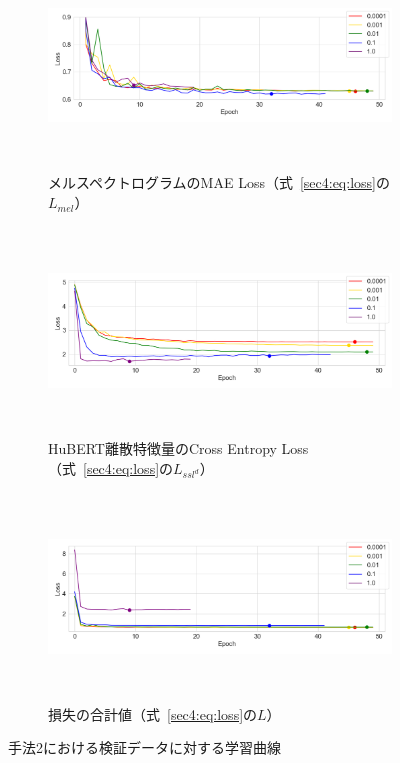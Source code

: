 \documentclass[12pt]{jarticle}
\numberwithin{equation}{section}    %
\numberwithin{figure}{section}      %
\numberwithin{table}{section}      %
\begin{document}
\begin{figure}[bt]
    \centering
    \begin{subfigure}{\linewidth}
        \centering
        \includegraphics[height=55mm]{./figure/sec4/learning_curve/impact_of_loss_weights_across_methods/2/mel_loss.png}
        \caption{メルスペクトログラムのMAE Loss（式~\eqref{sec4:eq:loss}の$L_{mel}$）}
        \label{sec4:fig:learning_curve_method_2_val_mel_loss}
    \end{subfigure}
    \begin{subfigure}{\linewidth}
        \centering
        \includegraphics[height=55mm]{./figure/sec4/learning_curve/impact_of_loss_weights_across_methods/2/ssl_feature_cluster_loss.png}
        \caption{HuBERT離散特徴量のCross Entropy Loss（式~\eqref{sec4:eq:loss}の$L_{ssl^{d}}$）}
        \label{sec4:fig:learning_curve_method_2_val_ssl_feature_cluster_loss}
    \end{subfigure}
    \begin{subfigure}{\linewidth}
        \centering
        \includegraphics[height=55mm]{./figure/sec4/learning_curve/impact_of_loss_weights_across_methods/2/total_loss.png}
        \caption{損失の合計値（式~\eqref{sec4:eq:loss}の$L$）}
        \label{sec4:fig:learning_curve_method_2_val_total_loss}
    \end{subfigure}
    \caption{手法2における検証データに対する学習曲線}
    \label{sec4:fig:learning_curve_method_2_val_losses}
\end{figure}
\end{document}
